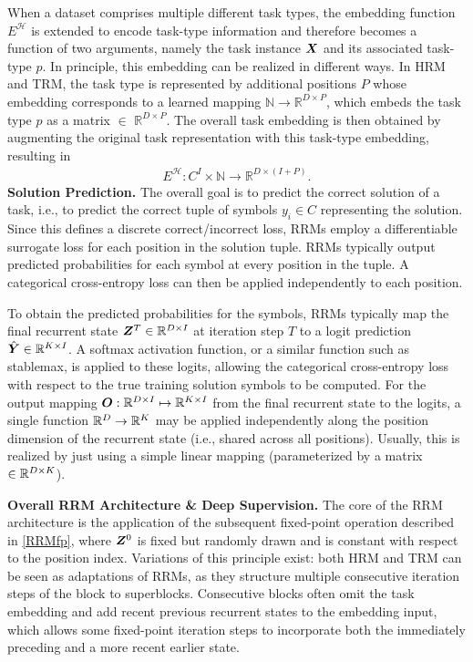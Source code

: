 \documentclass{article}
\theoremstyle{plain}
\theoremstyle{definition}
\theoremstyle{remark}
\renewcommand{\paragraph}[1]{\textbf{#1}\;}
\begin{document}
When a dataset comprises multiple different task types, the embedding function $E^{\mathcal H}$ is extended to encode task-type information and therefore becomes a function of two arguments, namely the task instance $\bm{X}$ and its associated task-type $p$. In principle, this embedding can be realized in different ways. In HRM and TRM, the task type is represented by additional positions ${P}$ whose embedding corresponds to a learned mapping $ \mathbb{N} \to \mathbb{R}^{D \times P}$, which embeds the task type $p$ as a matrix $\in$ $\mathbb{R}^{D \times P}$. The overall task embedding is then obtained by augmenting the original task representation with this task-type embedding, resulting in
\begin{align}
E^{\mathcal H} : C^I \times \mathbb{N} \rightarrow \mathbb{R}^{D \times (I+P)} .
\end{align}
\paragraph{Solution Prediction.}
The overall goal is to predict the correct solution of a task, i.e., to predict the correct tuple of symbols $y_i \in C $ representing the solution. Since this defines a discrete correct/incorrect loss, RRMs employ a differentiable surrogate loss for each position in the solution tuple.
RRMs typically output predicted probabilities for each symbol at every position in the tuple. A categorical cross-entropy loss can then be applied independently to each position.

To obtain the predicted probabilities for the symbols, RRMs typically map the final recurrent state $\bm{Z}^T \in \mathbb{R}^{D \times I}$ at iteration step $T$ to a logit prediction $\hat {\bm{Y}} \in \mathbb{R}^{K \times I}$.
A softmax activation function, or a similar function such as stablemax, is applied to these logits, allowing the categorical cross-entropy loss with respect to the true training solution symbols to be computed. For the output mapping $\bm{O}: \mathbb{R}^{D \times I} \mapsto \mathbb{R}^{K \times I}$ from the final recurrent state to the logits, a single function $\mathbb{R}^{D} \to \mathbb{R}^{K}$ may be applied independently along the position dimension of the recurrent state (i.e., shared across all positions). Usually, this is realized by just using a simple linear mapping (parameterized by a matrix $\in \mathbb{R}^{D \times K}$).

\paragraph{Overall RRM Architecture \& Deep Supervision.}
The core of the RRM architecture is the application of the subsequent fixed-point operation described in \cref{RRMfp}, where $\bm{Z}^0$ is fixed but randomly drawn and is constant with respect to the position index. Variations of this principle exist: both HRM and TRM can be seen as adaptations of RRMs, as they structure multiple consecutive iteration steps of the block to superblocks. 
Consecutive blocks often omit the task embedding and add recent previous recurrent states to the embedding input, which allows some fixed-point iteration steps to incorporate both the immediately preceding and a more recent earlier state.
\end{document}
